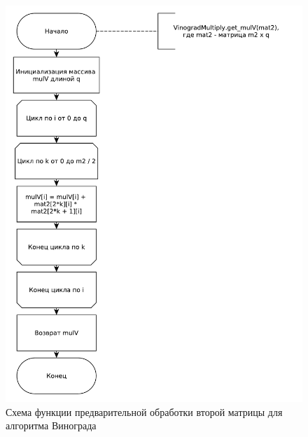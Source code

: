 \documentclass[a4paper,oneside,14pt]{extreport}
\begin{document}
\begin{figure}[H]
	\centering
	\includegraphics[width=0.9\linewidth]{images/vinograd_get_mulv}
	\caption{Схема функции предварительной обработки второй матрицы для алгоритма Винограда}
	\label{fig:vin_mulv}
\end{figure}
\end{document}
